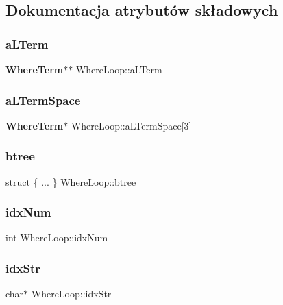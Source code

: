 \subsection{Dokumentacja atrybutów składowych}
\mbox{\label{struct_where_loop_ad8ea95e5ef2717fbbe1c1732d3ce1a9b}} 
\subsubsection{aLTerm}
{\footnotesize\ttfamily \textbf{ Where\+Term}$\ast$$\ast$ Where\+Loop\+::a\+L\+Term}

\mbox{\label{struct_where_loop_a1e0a39de75d4288c791c29e2ebf8103a}} 
\subsubsection{aLTermSpace}
{\footnotesize\ttfamily \textbf{ Where\+Term}$\ast$ Where\+Loop\+::a\+L\+Term\+Space[3]}

\mbox{\label{struct_where_loop_a16da5018682b7419e5cf7c3ea378b7ea}} 
\subsubsection{btree}
{\footnotesize\ttfamily struct \{ ... \}   Where\+Loop\+::btree}

\mbox{\label{struct_where_loop_a17718181319ebc4fd1493f270d0d781d}} 
\subsubsection{idxNum}
{\footnotesize\ttfamily int Where\+Loop\+::idx\+Num}

\mbox{\label{struct_where_loop_ab6f35b7aa07a01bd441681ffc383e810}} 
\subsubsection{idxStr}
{\footnotesize\ttfamily char$\ast$ Where\+Loop\+::idx\+Str}

\mbox{\label{struct_where_loop_ae3b2b37da95a17853ca2e29ae82c7a5b}} 
